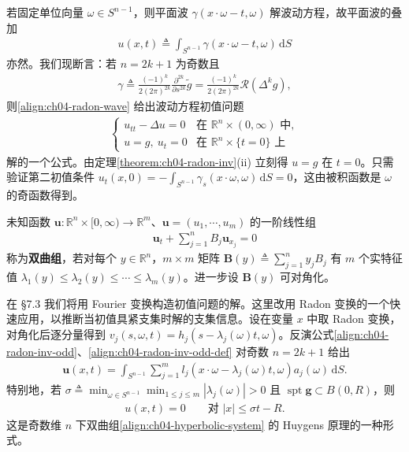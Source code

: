\documentclass[../../main.tex]{subfiles}
\begin{document}
\begin{example}[波动方程的另一表示公式]\label{example:ch04-wave-radon}若固定单位向量 $\omega\in S^{n-1}$，则平面波 $\gamma(x\cdot\omega-t,\omega)$ 解波动方程，故平面波的叠加
\begin{align}\label{align:ch04-radon-wave}
u(x,t)\triangleq\int_{S^{n-1}}\gamma(x\cdot\omega-t,\omega)\,\mathrm{d}S
\end{align}
亦然。我们现断言：若 $n=2k+1$ 为奇数且
\begin{align}\label{align:ch04-radon-gamma}
\gamma\triangleq\frac{(-1)^k}{2(2\pi)^{2k}}\frac{\partial^{2k}}{\partial s^{2k}}\widetilde{g}=\frac{(-1)^k}{2(2\pi)^{2k}}\mathcal{R}(\Delta^k g),
\end{align}
则\eqref{align:ch04-radon-wave} 给出波动方程初值问题
\begin{align}\label{align:ch04-wave-radon-ivp}
\begin{cases}
u_{tt}-\Delta u=0 & \text{在 }\mathbb{R}^n\times(0,\infty)\text{ 中},\\
u=g,\ u_t=0 & \text{在 }\mathbb{R}^n\times\{t=0\}\text{ 上}
\end{cases}
\end{align}
解的一个公式。由定理\cref{theorem:ch04-radon-inv}(ii) 立刻得 $u=g$ 在 $t=0$。只需验证第二初值条件 $u_t(x,0)=-\int_{S^{n-1}}\gamma_s(x\cdot\omega,\omega)\,\mathrm{d}S=0$，这由被积函数是 $\omega$ 的奇函数得到。
\end{example}

\begin{example}\label{example:ch04-huygens}未知函数 $\mathbf{u}:\mathbb{R}^n\times[0,\infty)\to\mathbb{R}^m$、$\mathbf{u}=(u_1,\cdots,u_m)$ 的一阶线性组
\begin{align}\label{align:ch04-hyperbolic-system}
\mathbf{u}_t+\sum_{j=1}^n B_j\mathbf{u}_{x_j}=0
\end{align}
称为\textbf{双曲组}，若对每个 $y\in\mathbb{R}^n$，$m\times m$ 矩阵 $\mathbf{B}(y)\triangleq\sum_{j=1}^n y_jB_j$ 有 $m$ 个实特征值 $\lambda_1(y)\leqslant\lambda_2(y)\leqslant\cdots\leqslant\lambda_m(y)$。进一步设 $\mathbf{B}(y)$ 可对角化。

在 \S7.3 我们将用 Fourier 变换构造初值问题的解。这里改用 Radon 变换的一个快速应用，以推断当初值具紧支集时解的支集信息。设在变量 $x$ 中取 Radon 变换，对角化后逐分量得到 $v_j(s,\omega,t)=h_j(s-\lambda_j(\omega)t,\omega)$。反演公式\eqref{align:ch04-radon-inv-odd}、\eqref{align:ch04-radon-inv-odd-def} 对奇数 $n=2k+1$ 给出
\begin{align}\label{align:ch04-huygens-sol}
\mathbf{u}(x,t)=\int_{S^{n-1}}\sum_{j=1}^m l_j(x\cdot\omega-\lambda_j(\omega)t,\omega)a_j(\omega)\,\mathrm{d}S.
\end{align}
特别地，若 $\sigma\triangleq\min_{\omega\in S^{n-1}}\min_{1\leqslant j\leqslant m}|\lambda_j(\omega)|>0$ 且 $\operatorname{spt}\mathbf{g}\subset B(0,R)$，则
\begin{align}\label{align:ch04-huygens}
u(x,t)=0 \qquad\text{对 }|x|\leqslant\sigma t-R.
\end{align}
这是奇数维 $n$ 下双曲组\eqref{align:ch04-hyperbolic-system} 的 Huygens 原理的一种形式。
\end{example}
\end{document}
